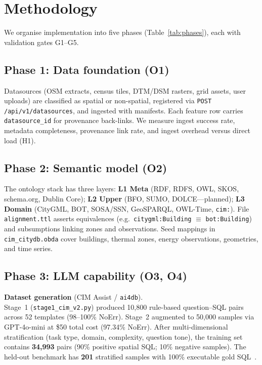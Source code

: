 \section{Methodology}
\label{sec:methodology}

We organise implementation into five phases (Table~\ref{tab:phases}), each with validation gates G1--G5.



\subsection{Phase 1: Data foundation (O1)}

Datasources (OSM extracts, census tiles, DTM/DSM rasters, grid assets, user uploads) are classified as spatial or non-spatial, registered via \texttt{POST /api/v1/datasources}, and ingested with manifests.
Each feature row carries \texttt{datasource\_id} for provenance back-links.
We measure ingest success rate, metadata completeness, provenance link rate, and ingest overhead versus direct load (H1).

\subsection{Phase 2: Semantic model (O2)}

The ontology stack has three layers:
\textbf{L1 Meta} (RDF, RDFS, OWL, SKOS, schema.org, Dublin Core);
\textbf{L2 Upper} (BFO, SUMO, DOLCE---planned);
\textbf{L3 Domain} (CityGML, BOT, SOSA/SSN, GeoSPARQL, OWL-Time, \texttt{cim:}).
File \texttt{alignment.ttl} asserts equivalences (e.g.\ \texttt{citygml:Building} $\equiv$ \texttt{bot:Building}) and subsumptions linking zones and observations.
Seed mappings in \texttt{cim\_citydb.obda} cover buildings, thermal zones, energy observations, geometries, and time series.

\subsection{Phase 3: LLM capability (O3, O4)}

\textbf{Dataset generation} (CIM Assist / \texttt{ai4db}).\\
Stage~1 (\texttt{stage1\_cim\_v2.py}) produced 10,800 rule-based question--SQL pairs across 52 templates (98--100\% NoErr).
Stage~2 augmented to 50,000 samples via GPT-4o-mini at \$50 total cost (97.34\% NoErr).
After multi-dimensional stratification (task type, domain, complexity, question tone), the training set contains \textbf{34,993} pairs (90\% positive spatial SQL; 10\% negative samples).
The held-out benchmark has \textbf{201} stratified samples with 100\% executable gold SQL~\cite{taherdoust2025cimassist}.

